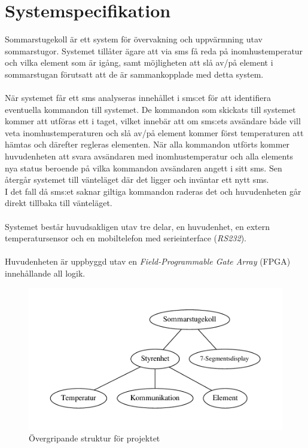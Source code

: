 \documentclass[a4paper]{scrartcl}
\begin{document}
\section{Systemspecifikation}
	Sommarstugekoll är ett system för övervakning och uppvärmning utav
	sommarstugor. Systemet  tillåter ägare att via sms få reda på inomhustemperatur och vilka
	element som är igång, samt möjligheten att slå av/på element i sommarstugan förutsatt att de
	är sammankopplade med detta system.
	\\\\
	När systemet får ett sms analyseras innehållet i sms:et för att identifiera eventuella kommandon
	till systemet. De kommandon som skickats till systemet kommer att utföras ett i taget, vilket
	innebär att om sms:ets avsändare både vill veta inomhustemperaturen och slå av/på element
	kommer först temperaturen att hämtas och därefter regleras elementen.  När alla kommandon
	utförts kommer huvudenheten att svara avsändaren med inomhustemperatur och alla elements
	nya status beroende på vilka kommandon avsändaren angett i sitt sms. Sen återgår systemet till
	vänteläget där det ligger och inväntar ett nytt sms.\\
	I det fall då sms:et saknar giltiga kommandon raderas det och huvudenheten går direkt tillbaka till
	vänteläget.
	\\\\
	Systemet består huvudsakligen  utav tre delar, en huvudenhet,  en extern temperatursensor och en
	mobiltelefon med serieinterface (\emph{RS232}).
	\\\\
	Huvudenheten är uppbyggd utav en \emph{Field-Programmable Gate Array} (FPGA) innehållande
	all logik.
\begin{figure}[H]
	\centering
	\includegraphics[width=\textwidth]{bigpicture.pdf}
	\caption{Övergripande struktur för projektet}
\end{figure}
\end{document}
